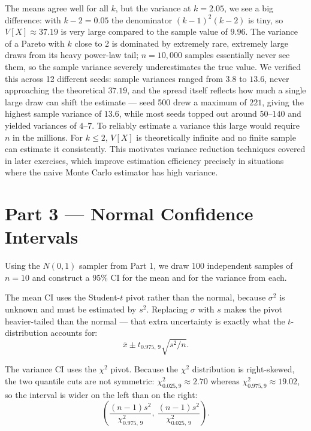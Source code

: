 The means agree well for all $k$, but the variance at $k = 2.05$, we see a big difference: with $k - 2 = 0.05$ the denominator $(k-1)^2(k-2)$ is tiny, so
$V[X] \approx 37.19$ is very large compared to the sample value of $9.96$. The
variance of a Pareto with $k$ close to 2 is dominated by extremely rare,
extremely large draws from its heavy power-law tail; $n = 10{,}000$ samples
essentially never see them, so the sample variance severely underestimates
the true value. We verified this across 12 different seeds: sample variances
ranged from $3.8$ to $13.6$, never approaching the theoretical $37.19$, and
the spread itself reflects how much a single large draw can shift the estimate ---
seed 500 drew a maximum of $221$, giving the highest sample variance of $13.6$,
while most seeds topped out around $50$--$140$ and yielded variances of $4$--$7$.
To reliably estimate a variance this large would require $n$ in the millions.
For $k \leq 2$, $V[X]$ is theoretically infinite and no finite
sample can estimate it consistently. This motivates variance reduction
techniques covered in later exercises, which improve estimation efficiency
precisely in situations where the naive Monte Carlo estimator has high variance.

\section*{Part 3 --- Normal Confidence Intervals}

Using the $N(0,1)$ sampler from Part 1, we draw 100 independent samples of
$n = 10$ and construct a 95\% CI for the mean and for the variance from each.

The mean CI uses the Student-$t$ pivot rather than the normal, because $\sigma^2$
is unknown and must be estimated by $s^2$. Replacing $\sigma$ with $s$ makes the
pivot heavier-tailed than the normal --- that extra uncertainty is exactly what
the $t$-distribution accounts for:
\begin{equation}
    \bar{x} \pm t_{0.975,\,9}\sqrt{s^2/n}.
    \label{eq:ci-mean}
\end{equation}

The variance CI uses the $\chi^2$ pivot. Because the $\chi^2$ distribution is
right-skewed, the two quantile cuts are not symmetric: $\chi^2_{0.025,9} \approx 2.70$
whereas $\chi^2_{0.975,9} \approx 19.02$, so the interval is wider on the left
than on the right:
\begin{equation}
    \left(\frac{(n-1)s^2}{\chi^2_{0.975,\,9}},\ \frac{(n-1)s^2}{\chi^2_{0.025,\,9}}\right).
    \label{eq:ci-var}
\end{equation}

